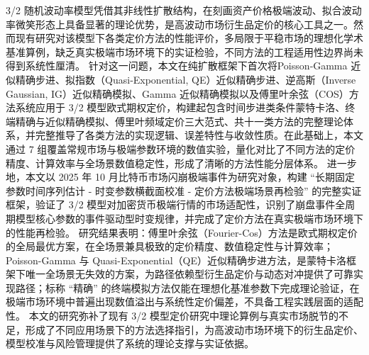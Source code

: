 \begin{cabstract}
	3/2 随机波动率模型凭借其非线性扩散结构，在刻画资产价格极端波动、拟合波动率微笑形态上具备显著的理论优势，是高波动市场衍生品定价的核心工具之一。然而现有研究对该模型下各类定价方法的性能评价，多局限于平稳市场的理想化学术基准算例，缺乏真实极端市场环境下的实证检验，不同方法的工程适用性边界尚未得到系统性厘清。
	针对这一问题，本文在纯扩散框架下首次将Poisson‑Gamma 近似精确步进、拟指数（Quasi‑Exponential, QE）近似精确步进、逆高斯（Inverse Gaussian, IG）近似精确模拟、Gamma 近似精确模拟以及傅里叶余弦（COS）方法系统应用于 3/2 模型欧式期权定价，构建起包含时间步进类条件蒙特卡洛、终端精确与近似精确模拟、傅里叶频域定价三大范式、共十一类方法的完整理论体系，并完整推导了各类方法的实现逻辑、误差特性与收敛性质。在此基础上，本文通过 7 组覆盖常规市场与极端参数环境的数值实验，量化对比了不同方法的定价精度、计算效率与全场景数值稳定性，形成了清晰的方法性能分层体系。
	进一步地，本文以 2025 年 10 月比特币市场闪崩极端事件为研究对象，构建 “长期固定参数时间序列估计 - 时变参数横截面校准 - 定价方法极端场景再检验” 的完整实证框架，验证了 3/2 模型对加密货币极端行情的市场适配性，识别了崩盘事件全周期模型核心参数的事件驱动型时变规律，并完成了定价方法在真实极端市场环境下的性能再检验。
	研究结果表明：傅里叶余弦（Fourier-Cos）方法是欧式期权定价的全局最优方案，在全场景兼具极致的定价精度、数值稳定性与计算效率；Poisson-Gamma 与 Quasi-Exponential（QE）近似精确步进方法，是蒙特卡洛框架下唯一全场景无失效的方案，为路径依赖型衍生品定价与动态对冲提供了可靠实现路径；标称 “精确” 的终端模拟方法仅能在理想化基准参数下完成理论验证，在极端市场环境中普遍出现数值溢出与系统性定价偏差，不具备工程实践层面的适配性。
	本文的研究弥补了现有 3/2 模型定价研究中理论算例与真实市场脱节的不足，形成了不同应用场景下的方法选择指引，为高波动市场环境下的衍生品定价、模型校准与风险管理提供了系统的理论支撑与实证依据。
\end{cabstract}


